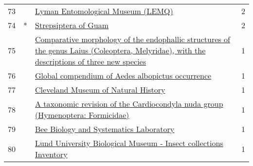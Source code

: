 \begin{longtable}{llp{5in}r}
73 &    &                                                                                                                                                                \href{https://www.gbif.org/dataset/275319e1-f91c-406f-b239-62cb9d4185cb}{Lyman Entomological Museum (LEMQ)} &             2 \\
74 &  * &                                                                                                                                                                             \href{https://www.gbif.org/dataset/5728a9af-6e4a-46e1-a28e-5e4aa1cb9a6f}{Strepsiptera of Guam} &             2 \\
75 &    &                                                      \href{https://www.gbif.org/dataset/37e33fa8-2cb4-4693-86c6-77bb430b5baa}{Comparative morphology of the endophallic structures of the genus Laius (Coleoptera, Melyridae), with the descriptions of three new species} &             1 \\
76 &    &                                                                                                                                                 \href{https://www.gbif.org/dataset/33614778-513a-4ec0-814d-125021cca5fe}{Global compendium of Aedes albopictus occurrence} &             1 \\
77 &    &                                                                                                                                                              \href{https://www.gbif.org/dataset/6c032b27-e4fe-4bc9-8f11-6b5f864910ce}{Cleveland Museum of Natural History} &             1 \\
78 &    &                                                                                                                   \href{https://www.gbif.org/dataset/3937c7f9-d611-4ce1-be9d-3d615adb919c}{A taxonomic revision of the Cardiocondyla nuda group (Hymenoptera: Formicidae)} &             1 \\
79 &    &                                                                                                                                                           \href{https://www.gbif.org/dataset/10e44c48-0839-4a20-86d5-f0e23ae2e366}{Bee Biology and Systematics Laboratory} &             1 \\
80 &    &                                                                                                                                 \href{https://www.gbif.org/dataset/2356f899-6244-4bbb-aa33-50e29132e86a}{Lund University Biological Museum - Insect collections Inventory} &             1 \\

\end{longtable}
